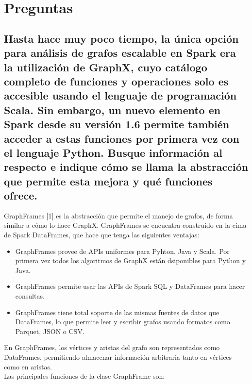 \documentclass[12pt,a4paper,twoside,openright,titlepage,final]{article}
\author{José Ignacio Escribano}
\title{}
\begin{document}
\setcounter{page}{1}


\tableofcontents
\thispagestyle{empty}
\newpage

\setcounter{page}{1}


\section{Preguntas}

\subsection{Hasta hace muy poco tiempo, la única opción para análisis de grafos escalable en Spark era la utilización de GraphX, cuyo catálogo completo de funciones y operaciones solo es accesible usando el lenguaje de programación Scala. Sin embargo, un nuevo elemento en Spark desde su versión 1.6 permite también acceder a estas funciones por primera vez con el lenguaje Python. Busque información al respecto e indique cómo se llama la abstracción que permite esta mejora y qué funciones ofrece.}

GraphFrames [1] es la abstracción que permite el manejo de grafos, de forma similar a cómo lo hace GraphX. GraphFrames se encuentra construido en la cima de Spark DataFrames, que hace que tenga las siguientes ventajas:

\begin{itemize}
	\item GraphFrames provee de APIs uniformes para Pyhton, Java y Scala. Por primera vez todos los algoritmos de GraphX están dsiponibles para Python y Java.
	\item GraphFrames permite usar las APIs de Spark SQL y DataFrames para hacer consultas.
	\item GraphFrames tiene total soporte de las mismas fuentes de datos que DataFrames, lo que permite leer y escribir grafos usando formatos como Parquet, JSON o CSV.
\end{itemize}

En GraphFrames, los vértices y aristas del grafo son representados como DataFrames, permitiendo almacenar información arbitraria tanto en vértices como en aristas.\\

Las principales funciones de la clase GraphFrame son:
\end{document}

